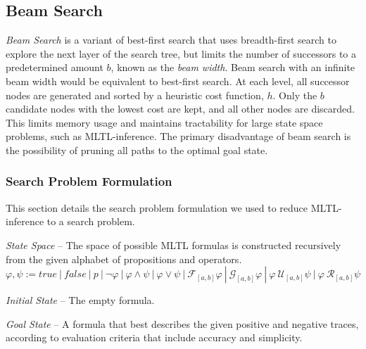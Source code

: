 \documentclass[12pt]{article}
\renewcommand{\phi}{\varphi}
\newcommand{\Until}{\ \mathcal{U}}         %
\newcommand{\Release}{\ \mathcal{R}}       %
\newcommand{\Globally}{\mathcal{G}}          %
\newcommand{\Finally}{\mathcal{F}}           %
\begin{document}
\subsection{Beam Search}


\textit{Beam Search} is a variant of best-first search that uses breadth-first search to explore the next layer of the search tree, but limits the number of successors to a predetermined amount $b$, known as the \textit{beam width}. Beam search with an infinite beam width would be equivalent to best-first search. At each level, all successor nodes are generated and sorted by a heuristic cost function, $h$. Only the $b$ candidate nodes with the lowest cost are kept, and all other nodes are discarded. This limits memory usage and maintains tractability for large state space problems, such as MLTL-inference. The primary disadvantage of beam search is the possibility of pruning all paths to the optimal goal state.

\subsubsection{Search Problem Formulation}

This section details the search problem formulation we used to reduce MLTL-inference to a search problem.

\textit{State Space} -- The space of possible MLTL formulas is constructed recursively from the given alphabet of propositions and operators.
\[
\phi, \psi := true \ | \ false \ | \ p \ | \ \neg \phi \ | \ \phi \land \psi \ | \ \phi \lor \psi \ | \ \Finally_{[a,b]} \phi \ | \ \Globally_{[a,b]} \phi \ | \ \phi \Until_{[a,b]} \psi \ | \ \phi \Release_{[a,b]} \psi
\]

\textit{Initial State} -- The empty formula.

\textit{Goal State} -- A formula that best describes the given positive and negative traces, according to evaluation criteria that include accuracy and simplicity.
\end{document}
